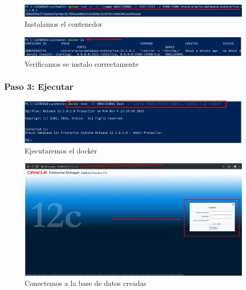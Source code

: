 \documentclass[preprint,12pt]{elsarticle}
\begin{document}
\begin{figure}[H]
	\begin{center}
		\includegraphics[width=12cm]{./IMAGENES/foto10} 
		\caption{Instalamos el contenedor}
	\end{center}
\end{figure}

\begin{figure}[H]
	\begin{center}
		\includegraphics[width=12cm]{./IMAGENES/foto11} 
		\caption{Verificamos se instalo correctamente}
	\end{center}
\end{figure}

\subsubsection{\textbf{Paso 3: Ejecutar}}
\begin{figure}[H]
	\begin{center}
		\includegraphics[width=12cm]{./IMAGENES/foto12} 
		\caption{Ejecutaremos el docker}
	\end{center}
\end{figure}

\begin{figure}[H]
	\begin{center}
		\includegraphics[width=12cm]{./IMAGENES/foto13} 
		\caption{Conectemos a la base de datos creadas}
	\end{center}
\end{figure}
\end{document}
